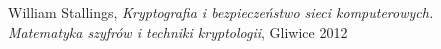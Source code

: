 \begin{thebibliography}{99}
	 William Stallings, \textit{Kryptografia i bezpieczeństwo sieci komputerowych. Matematyka szyfrów i techniki kryptologii}, Gliwice 2012
\end{thebibliography}
